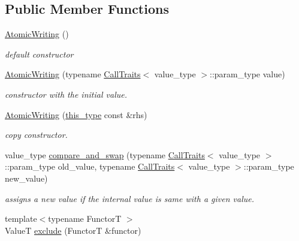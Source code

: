 \subsection*{Public Member Functions}
\begin{DoxyCompactItemize}
\item 
\hypertarget{classhryky_1_1exclusion_1_1_atomic_writing_a53b4f66f0702e2c4ca4705468827af7a}{\hyperlink{classhryky_1_1exclusion_1_1_atomic_writing_a53b4f66f0702e2c4ca4705468827af7a}{Atomic\-Writing} ()}\label{classhryky_1_1exclusion_1_1_atomic_writing_a53b4f66f0702e2c4ca4705468827af7a}

\begin{DoxyCompactList}\small\item\em default constructor \end{DoxyCompactList}\item 
\hyperlink{group__exclusion__control_ga2f63c0a66bb7b03eed3607ae9d14d126}{Atomic\-Writing} (typename \hyperlink{classhryky_1_1_call_traits}{Call\-Traits}$<$ value\-\_\-type $>$\-::param\-\_\-type value)
\begin{DoxyCompactList}\small\item\em constructor with the initial value. \end{DoxyCompactList}\item 
\hyperlink{group__exclusion__control_gac7297c603e75cf09b560894b0dedeb68}{Atomic\-Writing} (\hyperlink{classhryky_1_1exclusion_1_1_atomic_writing_afc6301af19df5cf042e0cbed6d273b2a}{this\-\_\-type} const \&rhs)
\begin{DoxyCompactList}\small\item\em copy constructor. \end{DoxyCompactList}\item 
value\-\_\-type \hyperlink{group__exclusion__control_gac693764e6a7a576464f5a48e3d9816d6}{compare\-\_\-and\-\_\-swap} (typename \hyperlink{classhryky_1_1_call_traits}{Call\-Traits}$<$ value\-\_\-type $>$\-::param\-\_\-type old\-\_\-value, typename \hyperlink{classhryky_1_1_call_traits}{Call\-Traits}$<$ value\-\_\-type $>$\-::param\-\_\-type new\-\_\-value)
\begin{DoxyCompactList}\small\item\em assigns a new value if the internal value is same with a given value. \end{DoxyCompactList}\item 
{\footnotesize template$<$typename Functor\-T $>$ }\\Value\-T \hyperlink{group__exclusion__control_gadd8b9f70d3ffa0442def7fca8fe2437c}{exclude} (Functor\-T \&functor)

\end{DoxyCompactItemize}
